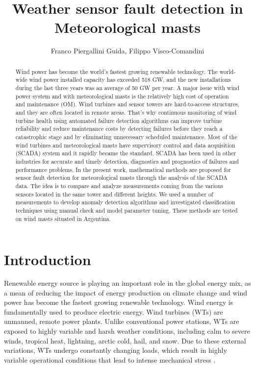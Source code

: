 \documentclass[journal]{IEEEtran}
\begin{document}
\title{Weather sensor fault detection in Meteorological masts}

\author{Franco Piergallini Guida, Filippo Visco-Comandini}
\maketitle

\begin{abstract}
Wind power has become the world's fastest growing renewable technology. The world-wide wind power installed capacity has exceeded 518 GW, and the new installations during the last three years was an average of 50 GW per year. A major issue with wind power system and with meteorological masts is the relatively high cost of operation and maintenance (OM). Wind turbines and sensor towers are hard-to-access structures, and they are often located in remote areas. That's why continuous monitoring of wind turbine health using automated failure detection algorithms can improve turbine reliability and reduce maintenance costs by detecting failures before they reach a catastrophic stage and by eliminating unnecessary scheduled maintenance.
Most of the wind turbines and meteorological masts have supervisory control and data acquisition (SCADA) system and it rapidly became the standard. SCADA has been used in other industries for accurate and timely detection, diagnostics and prognostics of failures and performance problems.
In the present work, mathematical methods are proposed for sensor fault detection for meteorological masts through the analysis of the SCADA data. The idea is to compare and analyze measurements coming from the various sensors located in the same tower and different heights. We used a number of measurements to develop anomaly detection algorithms and investigated classification techniques using manual check and model parameter tuning. 
These methods are tested on wind masts situated in Argentina.
\end{abstract}
\section{Introduction}
Renewable energy source is playing an important role in the global energy mix, as a mean of reducing the impact of energy production on climate change and wind power has become the fastest growing renewable technology. 
Wind energy is fundamentally used to produce electric energy. Wind turbines (WTs) are unmanned, remote power plants. Unlike conventional power stations, WTs are exposed to highly variable and harsh weather conditions, including calm to severe winds, tropical heat, lightning, arctic cold, hail, and snow. Due to these external variations, WTs undergo constantly changing loads, which result in highly variable operational conditions that lead to intense mechanical stress \cite{ribrant2006thesis}.
\end{document}
